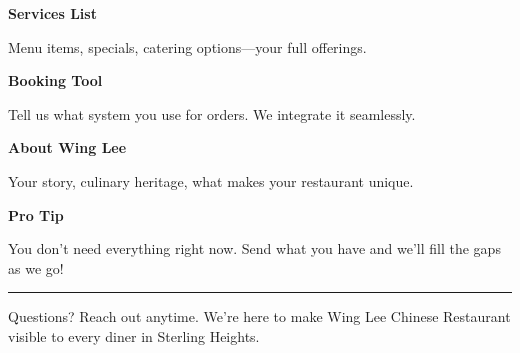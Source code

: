 \documentclass[11pt,letterpaper]{article}
\begin{document}
\begin{minipage}[t]{0.48\textwidth}
\begin{tcolorbox}[colframe=accent-teal, boxrule=1pt, left=0.7em, right=0.7em, top=0.5em, bottom=0.5em, arc=4pt, boxsep=0pt]
{\bfseries\small\color{accent-teal}Services List}

\vspace{0.15em}

{\small Menu items, specials, catering options—your full offerings.}
\end{tcolorbox}

\vspace{0.1em}

\begin{tcolorbox}[colframe=accent-teal, boxrule=1pt, left=0.7em, right=0.7em, top=0.5em, bottom=0.5em, arc=4pt, boxsep=0pt]
{\bfseries\small\color{accent-teal}Booking Tool}

\vspace{0.15em}

{\small Tell us what system you use for orders. We integrate it seamlessly.}
\end{tcolorbox}

\vspace{0.1em}

\begin{tcolorbox}[colframe=accent-teal, boxrule=1pt, left=0.7em, right=0.7em, top=0.5em, bottom=0.5em, arc=4pt, boxsep=0pt]
{\bfseries\small\color{accent-teal}About Wing Lee}

\vspace{0.15em}

{\small Your story, culinary heritage, what makes your restaurant unique.}
\end{tcolorbox}

\vspace{-0.2em}
\end{minipage}

\vspace{0.15em}

\begin{tcolorbox}[colback={accent-red!5}, colframe=accent-red!20, boxrule=0.5pt, left=0.7em, right=0.7em, top=0.4em, bottom=0.4em, arc=6pt, boxsep=0pt]

{\bfseries\small\color{accent-red}Pro Tip}

\vspace{0.1em}

{\small You don't need everything right now. Send what you have and we'll fill the gaps as we go!}

\end{tcolorbox}

\vspace{0.15em}

\noindent\hrule
\vspace{0.2em}

{\small\color{text-light}Questions? Reach out anytime. We're here to make Wing Lee Chinese Restaurant visible to every diner in Sterling Heights.}
\end{document}
